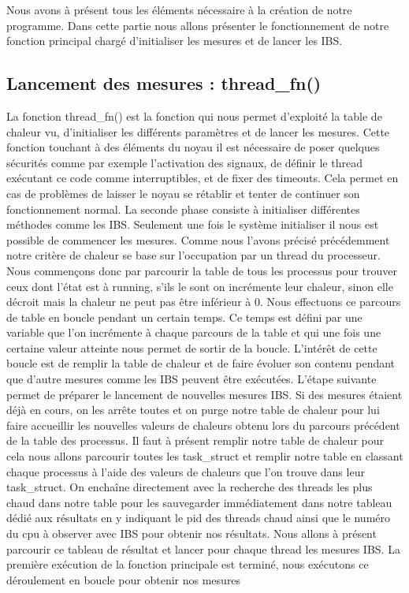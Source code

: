     Nous avons à présent tous les éléments nécessaire à la création de notre
    programme. Dans cette partie nous allons présenter le fonctionnement de
    notre fonction principal chargé d'initialiser les mesures et de lancer les
    IBS.

    \subsection{Lancement des mesures : thread\_fn()}

      La fonction thread\_fn() est la fonction qui nous permet d'exploité la
      table de chaleur vu, d'initialiser les différents paramètres et de lancer
      les mesures.  Cette fonction touchant à des éléments du noyau il est
      nécessaire de poser quelques sécurités comme par exemple l'activation des
      signaux, de définir le thread exécutant ce code comme interruptibles, et
      de fixer des timeouts. Cela permet en cas de problèmes de laisser le noyau
      se rétablir et tenter de continuer son fonctionnement normal.  La seconde
      phase consiste à initialiser différentes méthodes comme les IBS.
      Seulement une fois le système initialiser il nous est possible de
      commencer les mesures.  Comme nous l'avons précisé précédemment notre
      critère de chaleur se base sur l'occupation par un thread du
      processeur. Nous commençons donc par parcourir la table de tous les
      processus pour trouver ceux dont l'état est à running, s'ils le sont on
      incrémente leur chaleur, sinon elle décroit mais la chaleur ne peut pas
      être inférieur à 0.  Nous effectuons ce parcours de table en boucle
      pendant un certain temps. Ce temps est défini par une variable que l'on
      incrémente à chaque parcours de la table et qui une fois une certaine
      valeur atteinte nous permet de sortir de la boucle. L’intérêt de cette
      boucle est de remplir la table de chaleur et de faire évoluer son contenu
      pendant que d'autre mesures comme les IBS peuvent être exécutées.  L'étape
      suivante permet de préparer le lancement de nouvelles mesures IBS. Si des
      mesures étaient déjà en cours, on les arrête toutes et on purge notre
      table de chaleur pour lui faire accueillir les nouvelles valeurs de
      chaleurs obtenu lors du parcours précédent de la table des processus.  Il
      faut à présent remplir notre table de chaleur pour cela nous allons
      parcourir toutes les task\_struct et remplir notre table en classant
      chaque processus à l'aide des valeurs de chaleurs que l'on trouve dans
      leur task\_struct. On enchaîne directement avec la recherche des threads
      les plus chaud dans notre table pour les sauvegarder immédiatement dans
      notre tableau dédié aux résultats en y indiquant le pid des threads chaud
      ainsi que le numéro du cpu à observer avec IBS pour obtenir nos résultats.
      Nous allons à présent parcourir ce tableau de résultat et lancer pour
      chaque thread les mesures IBS.  La première exécution de la fonction
      principale est terminé, nous exécutons ce déroulement en boucle pour
      obtenir nos mesures


